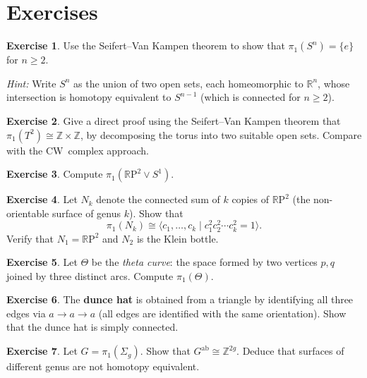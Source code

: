\documentclass[12pt,a4paper,openany]{book}
\theoremstyle{definition}
\newtheorem{exercise}{Exercise}[chapter]
\theoremstyle{plain}
\theoremstyle{remark}
\newcommand{\Z}{\mathbb{Z}}
\newcommand{\R}{\mathbb{R}}
\newcommand{\RP}{\mathbb{R}\mathrm{P}}
\begin{document}
\section{Exercises}\label{sec:svk-exercises}

\begin{exercise}\label{exo:svk-Sn}
  Use the Seifert--Van Kampen theorem to show that $\pi_1(S^n) = \{e\}$ for
  $n \geq 2$.

  \textit{Hint:} Write $S^n$ as the union of two open sets, each
  homeomorphic to $\R^n$, whose intersection is homotopy equivalent to
  $S^{n-1}$ (which is connected for $n \geq 2$).
\end{exercise}

\begin{exercise}\label{exo:svk-torus-direct}
  Give a direct proof using the Seifert--Van Kampen theorem that
  $\pi_1(T^2) \cong \Z \times \Z$, by decomposing the torus into two
  suitable open sets.  Compare with the CW~complex approach.
\end{exercise}

\begin{exercise}\label{exo:svk-RP2-wedge}
  Compute $\pi_1(\RP^2 \vee S^1)$.
\end{exercise}

\begin{exercise}\label{exo:svk-non-orientable}
  Let $N_k$ denote the connected sum of $k$ copies of $\RP^2$ (the
  non-orientable surface of genus $k$).  Show that
  \[
    \pi_1(N_k) \cong \langle c_1, \ldots, c_k \mid c_1^2 c_2^2 \cdots c_k^2 = 1 \rangle.
  \]
  Verify that $N_1 = \RP^2$ and $N_2$ is the Klein bottle.
\end{exercise}

\begin{exercise}\label{exo:svk-theta}
  Let $\Theta$ be the \emph{theta curve}: the space formed by two vertices
  $p, q$ joined by three distinct arcs.  Compute $\pi_1(\Theta)$.
\end{exercise}

\begin{exercise}\label{exo:svk-dunce}
  The \textbf{dunce hat} is obtained from a triangle by identifying all three
  edges via $a \to a \to a$ (all edges are identified with the same
  orientation).  Show that the dunce hat is simply connected.
\end{exercise}

\begin{exercise}\label{exo:svk-abelianize}
  Let $G = \pi_1(\Sigma_g)$.  Show that $G^{\mathrm{ab}} \cong \Z^{2g}$.
  Deduce that surfaces of different genus are not homotopy equivalent.
\end{exercise}
\end{document}
